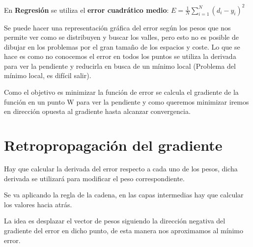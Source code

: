 \documentclass[12pt, twoside, openright]{report} %
\begin{document}
En \textbf{Regresión} se utiliza el \textbf{error cuadrático medio}: $E=\frac 1 N \sum^N_{i=1} (d_i-y_i)^2$

Se puede hacer una representación gráfica del error según los pesos que nos permite ver como se distribuyen y buscar los valles, pero esto no es posible de dibujar en los problemas por el gran tamaño de los espacios y coste. Lo que se hace es como no conocemos el error en todos los puntos se utiliza la derivada para ver la pendiente y reducirla en busca de un mínimo local (Problema del mínimo local, es difícil salir).

Como el objetivo es minimizar la función de error se calcula el gradiente de la función en un punto W para ver la pendiente y como queremos minimizar iremos en dirección opuesta al gradiente hasta alcanzar convergencia.

\section{Retropropagación del gradiente}
Hay que calcular la derivada del error respecto a cada uno de los pesos, dicha derivada se utilizará para modificar el peso correspondiente.

Se va aplicando la regla de la cadena, en las capas intermedias hay que calcular los valores hacia atrás.

La idea es desplazar el vector de pesos siguiendo la dirección negativa del gradiente del error en dicho punto, de esta manera nos aproximamos al mínimo error.
\end{document}
